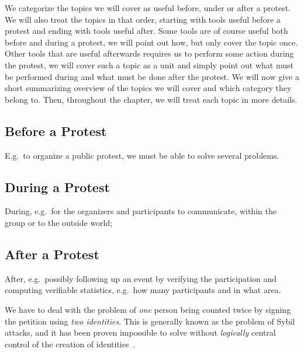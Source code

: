 We categorize the topics we will cover as useful before, under or after 
a protest.
We will also treat the topics in that order, starting with tools useful before 
a protest and ending with tools useful after.
Some tools are of course useful both before and during a protest, we will point 
out how, but only cover the topic once.
Other tools that are useful afterwards requires us to perform some action 
during the protest, we will cover such a topic as a unit and simply point out 
what must be performed during and what must be done after the protest.
We will now give a short summarizing overview of the topics we will cover and 
which category they belong to.
Then, throughout the chapter, we will treat each topic in more details.

\subsection{Before a Protest}

E.g.\ to organize a public protest, we must be able to solve several problems.

\subsection{During a Protest}

During, e.g.\ for the organizers and participants to communicate, within the 
group or to the outside world;

\subsection{After a Protest}

After, e.g.\ possibly following up an event by verifying the participation and 
computing verifiable statistics, e.g.\ how many participants and in what area.

We have to deal with the problem of \emph{one} person being counted twice by 
signing the petition using \emph{two identities}.
This is generally known as the problem of Sybil attacks, and it has been proven 
impossible to solve without \emph{logically} central control of the creation of 
identities~\cite{SybilAttack}.

